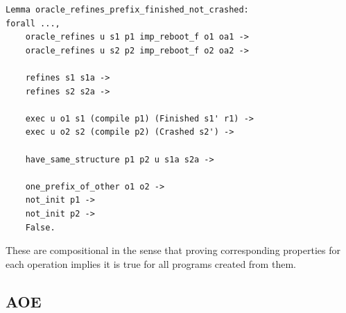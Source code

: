 \begin{verbatim}
Lemma oracle_refines_prefix_finished_not_crashed:
forall ...,
    oracle_refines u s1 p1 imp_reboot_f o1 oa1 ->
    oracle_refines u s2 p2 imp_reboot_f o2 oa2 ->
    
    refines s1 s1a ->
    refines s2 s2a ->
    
    exec u o1 s1 (compile p1) (Finished s1' r1) ->
    exec u o2 s2 (compile p2) (Crashed s2') ->
    
    have_same_structure p1 p2 u s1a s2a ->
    
    one_prefix_of_other o1 o2 ->
    not_init p1 ->
    not_init p2 ->
    False.
\end{verbatim}

These are compositional in the sense that proving corresponding properties for 
each operation implies it is true for all programs created from them. 

\subsection{AOE}
\fi